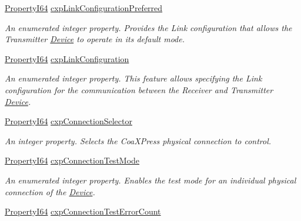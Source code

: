 \begin{DoxyCompactItemize}
\hyperlink{group___common_interface_ga81749b2696755513663492664a18a893}{Property\+I64} \hyperlink{classmv_i_m_p_a_c_t_1_1acquire_1_1_gen_i_cam_1_1_transport_layer_control_a54781c674406391ae8be27a26e528591}{cxp\+Link\+Configuration\+Preferred}
\begin{DoxyCompactList}\small\item\em An enumerated integer property. Provides the Link configuration that allows the Transmitter \hyperlink{classmv_i_m_p_a_c_t_1_1acquire_1_1_device}{Device} to operate in its default mode. \end{DoxyCompactList}\item 
\hyperlink{group___common_interface_ga81749b2696755513663492664a18a893}{Property\+I64} \hyperlink{classmv_i_m_p_a_c_t_1_1acquire_1_1_gen_i_cam_1_1_transport_layer_control_a683e00892c6c6b661be972fa266b09f9}{cxp\+Link\+Configuration}
\begin{DoxyCompactList}\small\item\em An enumerated integer property. This feature allows specifying the Link configuration for the communication between the Receiver and Transmitter \hyperlink{classmv_i_m_p_a_c_t_1_1acquire_1_1_device}{Device}. \end{DoxyCompactList}\item 
\hyperlink{group___common_interface_ga81749b2696755513663492664a18a893}{Property\+I64} \hyperlink{classmv_i_m_p_a_c_t_1_1acquire_1_1_gen_i_cam_1_1_transport_layer_control_af0b16a502f5627b798794e74c1573912}{cxp\+Connection\+Selector}
\begin{DoxyCompactList}\small\item\em An integer property. Selects the Coa\+X\+Press physical connection to control. \end{DoxyCompactList}\item 
\hyperlink{group___common_interface_ga81749b2696755513663492664a18a893}{Property\+I64} \hyperlink{classmv_i_m_p_a_c_t_1_1acquire_1_1_gen_i_cam_1_1_transport_layer_control_adb255706649959ca3e4254069faa097a}{cxp\+Connection\+Test\+Mode}
\begin{DoxyCompactList}\small\item\em An enumerated integer property. Enables the test mode for an individual physical connection of the \hyperlink{classmv_i_m_p_a_c_t_1_1acquire_1_1_device}{Device}. \end{DoxyCompactList}\item 
\hyperlink{group___common_interface_ga81749b2696755513663492664a18a893}{Property\+I64} \hyperlink{classmv_i_m_p_a_c_t_1_1acquire_1_1_gen_i_cam_1_1_transport_layer_control_a4920160ae7c2bc5016362fc0e502b91f}{cxp\+Connection\+Test\+Error\+Count}

\end{DoxyCompactItemize}
